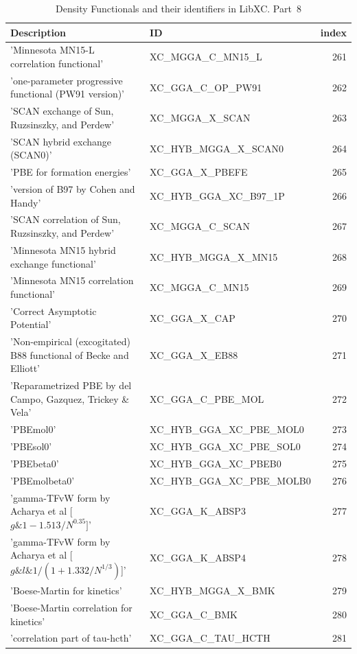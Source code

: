 \documentclass[final,12pt]{article}
\begin{document}
{{{{{{\begin{table}[!h]
\caption{Density Functionals and their identifiers in LibXC. Part~8}
\begin{center}
\begin{tabular}{llr}
\hline
\hline
Description & ID & index\\
\hline
  'Minnesota MN15-L correlation functional' & XC\_MGGA\_C\_MN15\_L  &261\\
  'one-parameter progressive functional (PW91 version)' & XC\_GGA\_C\_OP\_PW91  &262\\
  'SCAN exchange of Sun, Ruzsinszky, and Perdew' & XC\_MGGA\_X\_SCAN  &263\\
  'SCAN hybrid exchange (SCAN0)' & XC\_HYB\_MGGA\_X\_SCAN0  &264\\
  'PBE for formation energies' & XC\_GGA\_X\_PBEFE  &265\\
  'version of B97 by Cohen and Handy' & XC\_HYB\_GGA\_XC\_B97\_1P  &266\\
  'SCAN correlation of Sun, Ruzsinszky, and Perdew' & XC\_MGGA\_C\_SCAN  &267\\
  'Minnesota MN15 hybrid exchange functional' & XC\_HYB\_MGGA\_X\_MN15  &268\\
  'Minnesota MN15 correlation functional' & XC\_MGGA\_C\_MN15  &269\\
  'Correct Asymptotic Potential' & XC\_GGA\_X\_CAP  &270\\
  'Non-empirical (excogitated) B88 functional of Becke and Elliott' & XC\_GGA\_X\_EB88  &271\\
  'Reparametrized PBE by del Campo, Gazquez, Trickey \& Vela' & XC\_GGA\_C\_PBE\_MOL  &272\\
  'PBEmol0' & XC\_HYB\_GGA\_XC\_PBE\_MOL0  &273\\
  'PBEsol0' & XC\_HYB\_GGA\_XC\_PBE\_SOL0  &274\\
  'PBEbeta0' & XC\_HYB\_GGA\_XC\_PBEB0  &275\\
  'PBEmolbeta0' & XC\_HYB\_GGA\_XC\_PBE\_MOLB0  &276\\
  'gamma-TFvW form by Acharya et al [$g \& 1 - 1.513/N^{0.35}]$' & XC\_GGA\_K\_ABSP3  &277\\
  'gamma-TFvW form by Acharya et al [$g \& l \& 1/(1 + 1.332/N^{1/3})$]' & XC\_GGA\_K\_ABSP4  &278\\
  'Boese-Martin for kinetics' & XC\_HYB\_MGGA\_X\_BMK  &279\\
  'Boese-Martin correlation for kinetics' & XC\_GGA\_C\_BMK  &280\\
  'correlation part of tau-hcth' & XC\_GGA\_C\_TAU\_HCTH  &281\\

\end{tabular}
\end{center}
\end{table}}}}}}}
\end{document}
